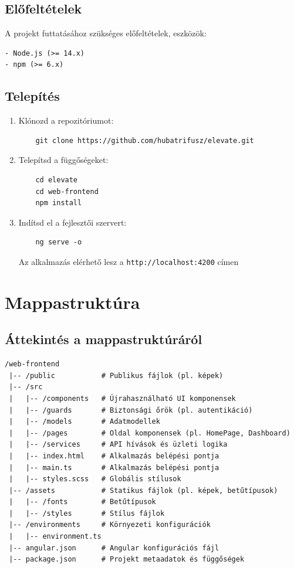 \documentclass[12pt]{report}
\begin{document}
\subsection{Előfeltételek}
A projekt futtatásához szükséges előfeltételek, eszközök:
\begin{verbatim}
- Node.js (>= 14.x)
- npm (>= 6.x)
\end{verbatim}

\subsection{Telepítés}
\begin{enumerate}
    \item Klónozd a repozitóriumot:
    \begin{verbatim}
    git clone https://github.com/hubatrifusz/elevate.git
    \end{verbatim}
    
    \item Telepítsd a függőségeket:
    \begin{verbatim}
    cd elevate
    cd web-frontend
    npm install
    \end{verbatim}
    
    \item Indítsd el a fejlesztői szervert:
    \begin{verbatim}
    ng serve -o
    \end{verbatim}
    Az alkalmazás elérhető lesz a \texttt{http://localhost:4200} címen
\end{enumerate}

\newpage
\section{Mappastruktúra}
\subsection{Áttekintés a mappastruktúráról}
\begin{verbatim}
/web-frontend
 |-- /public           # Publikus fájlok (pl. képek)
 |-- /src             
 |   |-- /components   # Újrahasználható UI komponensek
 |   |-- /guards       # Biztonsági őrök (pl. autentikáció)
 |   |-- /models       # Adatmodellek
 |   |-- /pages        # Oldal komponensek (pl. HomePage, Dashboard)
 |   |-- /services     # API hívások és üzleti logika
 |   |-- index.html    # Alkalmazás belépési pontja
 |   |-- main.ts       # Alkalmazás belépési pontja
 |   |-- styles.scss   # Globális stílusok
 |-- /assets           # Statikus fájlok (pl. képek, betűtípusok)
 |   |-- /fonts        # Betűtípusok
 |   |-- /styles       # Stílus fájlok
 |-- /environments     # Környezeti konfigurációk
 |   |-- environment.ts
 |-- angular.json      # Angular konfigurációs fájl
 |-- package.json      # Projekt metaadatok és függőségek
\end{verbatim}
\end{document}
